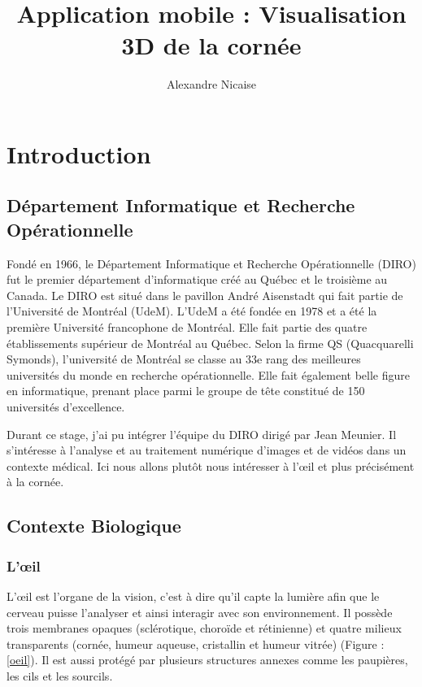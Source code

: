 \documentclass[a4paper,12pt]{article}
\author{Alexandre Nicaise}
\title{Application mobile : Visualisation 3D de la cornée}
\begin{document}
\maketitle

\newpage
\tableofcontents
\newpage
\section{Introduction}
	\subsection{Département Informatique et Recherche Opérationnelle}
Fondé en 1966, le Département Informatique et Recherche Opérationnelle (DIRO) fut le premier département d’informatique créé au Québec et le troisième au Canada. Le DIRO est situé dans le pavillon André Aisenstadt qui fait partie de l'Université de Montréal (UdeM). L'UdeM a été fondée en 1978 et a été la première Université francophone de Montréal. Elle fait partie des quatre établissements supérieur de Montréal au Québec. Selon la firme QS (Quacquarelli Symonds), l'université de Montréal se classe au 33e rang des meilleures universités du monde en recherche opérationnelle. Elle fait également belle figure en informatique, prenant place parmi le groupe de tête constitué de 150 universités d'excellence. 
		
Durant ce stage, j'ai pu intégrer l'équipe du DIRO dirigé par Jean Meunier. Il s'intéresse à l'analyse et au traitement numérique d’images et de vidéos dans un contexte médical. Ici nous allons plutôt nous intéresser à l'œil et plus précisément à la cornée.

	\subsection{Contexte Biologique}
		\subsubsection{L'œil}
		
L'œil est l'organe de la vision, c'est à dire qu'il capte la lumière afin que le cerveau puisse l'analyser et ainsi interagir avec son environnement. Il possède trois membranes opaques (sclérotique, choroïde et rétinienne) et quatre milieux transparents (cornée, humeur aqueuse, cristallin et humeur vitrée) (Figure : \ref{oeil}). Il est aussi protégé par plusieurs structures annexes comme les paupières, les cils et les sourcils.
\end{document}

